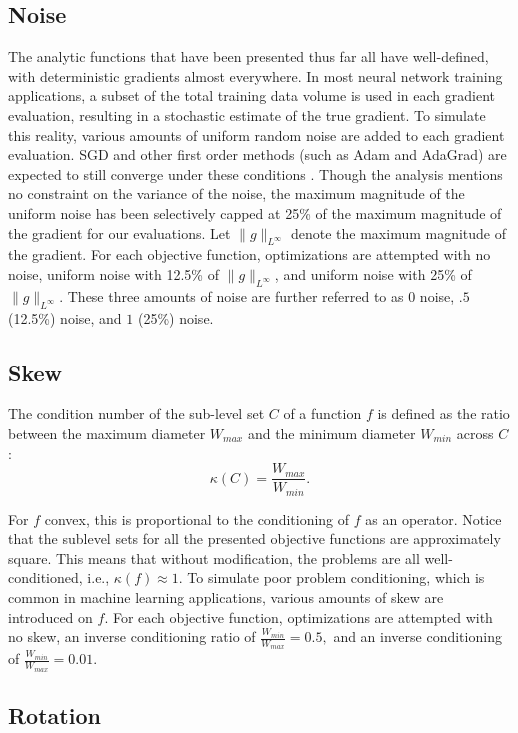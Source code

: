 \documentclass[conference]{ieeeconf}  %
\begin{document}
\subsection{Noise}

The analytic functions that have been presented thus far all have
well-defined, with deterministic gradients almost everywhere.  In most
neural network training applications, a subset of the total training
data volume is used in each gradient evaluation, resulting in a
stochastic estimate of the true gradient.  To simulate this reality,
various amounts of uniform random noise are added to each gradient
evaluation.  SGD and other first order methods (such as Adam and
AdaGrad) are expected to still converge under these conditions
\cite{nemirovski2009robust}.  Though the analysis mentions no
constraint on the variance of the noise, the maximum magnitude of the
uniform noise has been selectively capped at 25\% of the maximum
magnitude of the gradient for our evaluations.  Let $\|g\|_{L^\infty}$
denote the maximum magnitude of the gradient.  For each objective
function, optimizations are attempted with no noise, uniform noise
with 12.5\% of $\|g\|_{L^\infty}$, and uniform noise with 25\% of
$\|g\|_{L^\infty}$. These three amounts of noise are further referred
to as $0$ noise, $.5$ (12.5\%) noise, and $1$ (25\%) noise.

\subsection{Skew}

The condition number of the sub-level set $C$ of a function $f$ is
defined as the ratio between the maximum diameter $W_{max}$ and the
minimum diameter $W_{min}$ across $C$:
$$ \kappa(C) = \frac{W_{max}}{W_{min}}.$$

For $f$ convex, this is proportional to the conditioning of $f$ as an
operator.  Notice that the sublevel sets for all the presented
objective functions are approximately square.  This means that without
modification, the problems are all well-conditioned, i.e., $\kappa(f)
\approx 1$.  To simulate poor problem conditioning, which is common in
machine learning applications, various amounts of skew are introduced
on $f$.  For each objective function, optimizations are attempted with
no skew, an inverse conditioning ratio of $\frac{W_{min}}{W_{max}} =
0.5,$ and an inverse conditioning of $\frac{W_{min}}{W_{max}} = 0.01.$

\subsection{Rotation}
\end{document}
